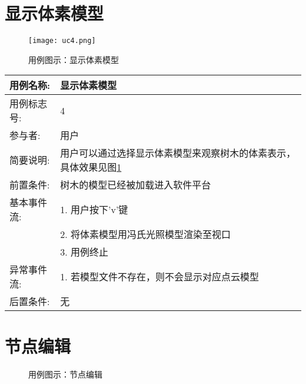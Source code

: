 \clearpage
\section{显示体素模型}
\begin{figure}[H]
	\centering
	\texttt{[image: uc4.png]}
	\caption{用例图示：显示体素模型}
	\label{fig:uc4}
\end{figure}

\begin{table}[H]
	\centering
\begin{tabular}{|l|p{8cm}|}
	\hline
	用例名称: & 显示体素模型\\
	\hline
	用例标志号: & 4\\
	\hline
	参与者: & 用户\\
	\hline
	简要说明: & 用户可以通过选择显示体素模型来观察树木的体素表示，具体效果见图\ref{fig:uc4}\\
	\hline
	前置条件: & 树木的模型已经被加载进入软件平台\\
	\hline
	基本事件流: & 1. 用户按下'v'键\\
	 & 2. 将体素模型用冯氏光照模型渲染至视口\\
	 & 3. 用例终止\\
	\hline
	异常事件流: & 1. 若模型文件不存在，则不会显示对应点云模型\\
	\hline
	后置条件: & 无\\
	\hline
\end{tabular}
\end{table}

\clearpage
\section{节点编辑}
\begin{figure}[H]
	\centering
	\hspace{3em}
	\hspace{3em}
	\hspace{3em}
	\hspace{3em}
	\hspace{3em}
	\hspace{3em}
	\caption{用例图示：节点编辑}
	\label{fig:uc5}
\end{figure}

